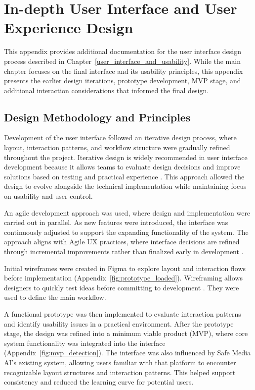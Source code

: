 \chapter{In-depth User Interface and User Experience Design}
\label{app:depth_ui_ux}

This appendix provides additional documentation for the user interface design process described in Chapter~\ref{user_interface_and_usability}. While the main chapter focuses on the final interface and its usability principles, this appendix presents the earlier design iterations, prototype development, MVP stage, and additional interaction considerations that informed the final design.

\section{Design Methodology and Principles}

Development of the user interface followed an iterative design process, where layout, interaction patterns, and workflow structure were gradually refined throughout the project. Iterative design is widely recommended in user interface development because it allows teams to evaluate design decisions and improve solutions based on testing and practical experience \cite{hartson2012ux}. This approach allowed the design to evolve alongside the technical implementation while maintaining focus on usability and user control.


An agile development approach was used, where design and implementation were carried out in parallel. As new features were introduced, the interface was continuously adjusted to support the expanding functionality of the system. The approach aligns with Agile UX practices, where interface decisions are refined through incremental improvements rather than finalized early in development \cite{gothelf2022leanux}. 

Initial wireframes were created in Figma to explore layout and interaction flows before implementation (Appendix~\ref{fig:prototype_loaded}). Wireframing allows designers to quickly test ideas before committing to development \cite{hartson2012ux}. They were used to define the main workflow.

A functional prototype was then implemented to evaluate interaction patterns and identify usability issues in a practical environment. After the prototype stage, the design was refined into a minimum viable product (MVP), where core system functionality was integrated into the interface (Appendix~\ref{fig:mvp_detection}). The interface was also influenced by Safe Media AI's existing system, allowing users familiar with that platform to encounter recognizable layout structures and interaction patterns. This helped support consistency and reduced the learning curve for potential users.

